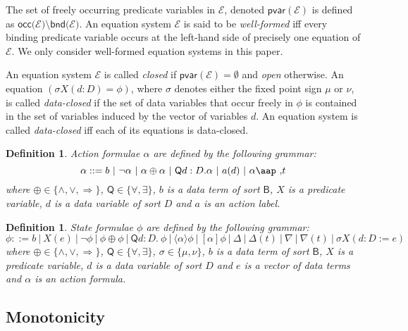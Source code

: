 \documentclass{article}
\newtheorem{definition}[theorem]{Definition}
\begin{document}
The set of freely occurring predicate variables in $\mathcal{E}$, denoted $%
\mathsf{pvar}(\mathcal{E})$ is defined as $\mathsf{occ(}{\mathcal{E)}}%
\setminus \mathsf{bnd(}{\mathcal{E)}}$. An equation system $\mathcal{E}$ is
said to be \emph{well-formed} iff every binding predicate variable occurs at
the left-hand side of precisely one equation of $\mathcal{E}$. We only
consider well-formed equation systems in this paper.

An equation system $\mathcal{E}$ is called \emph{closed} if $\mathsf{pvar}(%
\mathcal{E})=\emptyset $ and \emph{open} otherwise. An equation $(\sigma
X(d:D)=\phi )$, where $\sigma $ denotes either the fixed point sign $\mu $
or $\nu $, is called \emph{data-closed} if the set of data variables that
occur freely in $\phi $ is contained in the set of variables induced by the
vector of variables $d$. An equation system is called \emph{data-closed} iff
each of its equations is data-closed.\newline

\begin{definition}
\emph{Action formulae} $\alpha $ are defined by the following grammar:%
\begin{equation*}
\alpha ::=b~|~\lnot \alpha ~|~\alpha \oplus \alpha ~|~\mathsf{Q}d:D.\alpha
~|~a(d)~|~\alpha \mbox{\aap ,}t
\end{equation*}%
where $\oplus \in \{\wedge ,\vee ,\Rightarrow \}$, $\mathsf{Q}\in \{\forall
,\exists \}$, $b$ is a data term of sort $\mathsf{B}$, $X$ is a predicate
variable, $d$ is a data variable of sort $D$ and $a$ is an action label.
\end{definition}

\begin{definition}
\emph{State formulae} $\phi $ are defined by the following grammar:%
\begin{equation*}
\phi ::=b~|~X(e)~|~\lnot \phi ~|~\phi \oplus \phi ~|~\mathsf{Q}d:D.~\phi
~|~\langle \alpha \rangle \phi ~|~[\alpha ]\phi ~|~\Delta ~|~\Delta
(t)~|~\nabla ~|~\nabla (t)~|~\sigma X(d{:}D:=e)
\end{equation*}%
where $\oplus \in \{\wedge ,\vee ,\Rightarrow \}$, $\mathsf{Q}\in \{\forall
,\exists \}$, $\sigma \in \{\mu ,\nu \}$, $b$ is a data term of sort $%
\mathsf{B}$, $X$ is a predicate variable, $d$ is a data variable of sort $D$
and $e$ is a vector of data terms and $\alpha $ is an action formula.
\end{definition}

\newpage

\subsection{Monotonicity}
\end{document}

